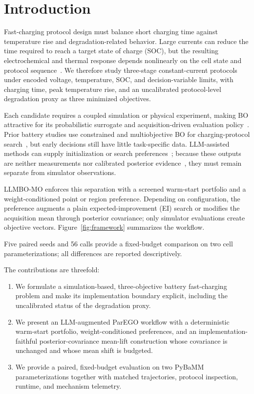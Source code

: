 \section{Introduction}
\label{sec:introduction}

Fast-charging protocol design must balance short charging time against
temperature rise and degradation-related behavior. Large currents can reduce
the time required to reach a target state of charge (SOC), but the resulting
electrochemical and thermal response depends nonlinearly on the cell state and
protocol sequence~\cite{ref2,ref3,ref23}. We therefore study three-stage
constant-current protocols under encoded voltage, temperature, SOC, and
decision-variable limits, with charging time, peak temperature rise, and an
uncalibrated protocol-level degradation proxy as three minimized objectives.

Each candidate requires a coupled simulation or physical experiment, making
BO attractive for its probabilistic surrogate and acquisition-driven
evaluation policy~\cite{ref4}. Prior battery studies use constrained and
multiobjective BO for charging-protocol search~\cite{ref7,ref8,ref15,ref18,
ref19}, but early decisions still have little task-specific data. LLM-assisted
methods can supply initialization or search preferences~\cite{ref9,ref10,
ref17}; because these outputs are neither measurements nor calibrated
posterior evidence~\cite{ref16}, they must remain separate from simulator
observations.

LLMBO-MO enforces this separation with a screened warm-start portfolio and a
weight-conditioned point or region preference. Depending on configuration,
the preference augments a plain expected-improvement (EI) search or modifies
the acquisition mean through posterior covariance; only simulator evaluations
create objective vectors. Figure~\ref{fig:framework} summarizes the workflow.

Five paired seeds and 56 calls provide a fixed-budget comparison on two cell
parameterizations; all differences are reported descriptively.

The contributions are threefold:
\begin{enumerate}
\item We formulate a simulation-based, three-objective battery fast-charging
problem and make its implementation boundary explicit, including the
uncalibrated status of the degradation proxy.
\item We present an LLM-augmented ParEGO workflow with a deterministic
warm-start portfolio, weight-conditioned preferences, and an
implementation-faithful posterior-covariance mean-lift construction whose
covariance is unchanged and whose mean shift is budgeted.
\item We provide a paired, fixed-budget evaluation on two PyBaMM
parameterizations together with matched trajectories, protocol inspection,
runtime, and mechanism telemetry.
\end{enumerate}
